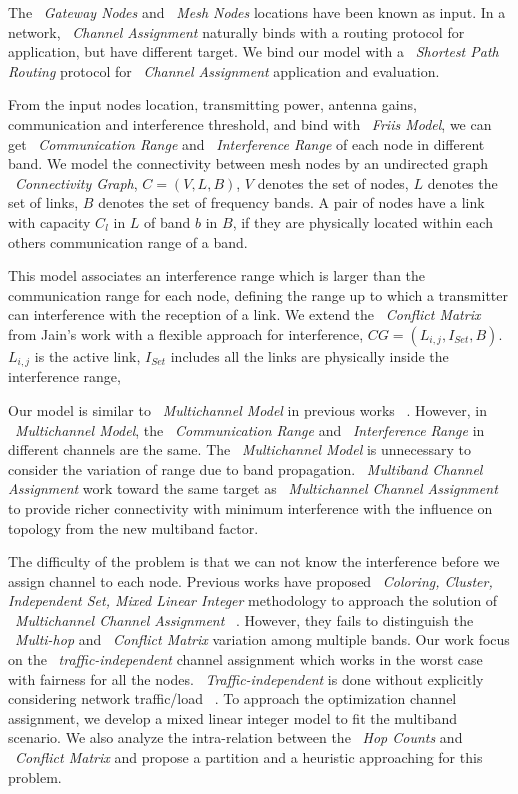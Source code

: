 The ~\emph{Gateway Nodes} and ~\emph{Mesh Nodes} locations have been known as input. In a network, ~\emph{Channel Assignment} naturally binds with a routing protocol for application, but have different target. We bind our model with a ~\emph{Shortest Path Routing} protocol for ~\emph{Channel Assignment} application and evaluation.

From the input nodes location, transmitting power, antenna gains, communication and interference threshold, and bind with ~\emph{Friis Model}, we can get ~\emph{Communication Range} and ~\emph{Interference Range} of each node in different band. 
We model the connectivity between mesh nodes by an undirected graph ~\emph{Connectivity Graph}, $C=(V,L,B)$, $V$ denotes the set of nodes, $L$ denotes the set of links, $B$ denotes the set of frequency bands. A pair of nodes have a link with capacity $C_l$ in $L$ of band $b$ in $B$, if they are physically located within each others communication range of a band. 

This model associates an interference range which is larger than the communication range for each node, defining the range up to which a transmitter can interference with the reception of a link. We extend the ~\emph{Conflict Matrix} from Jain's work with a flexible approach for interference, $CG=(L_{i,j},I_{Set},B)$. $L_{i,j}$ is the active link, $I_{Set}$ includes all the links are physically inside the interference range, 

Our model is similar to ~\emph{Multichannel Model} in previous works ~\cite{tang2005interference,yuan2006cross,si2010overview}. However, in ~\emph{Multichannel Model}, the ~\emph{Communication Range} and ~\emph{Interference Range} in different channels are the same. The ~\emph{Multichannel Model} is unnecessary to consider the variation of range due to band propagation.
~\emph{Multiband Channel Assignment} work toward the same target as ~\emph{Multichannel Channel Assignment} to provide richer connectivity with minimum interference with the influence on topology from the new multiband factor.

The difficulty of the problem is that we can not know the interference before we assign channel to each node. Previous works have proposed ~\emph{Coloring, Cluster, Independent Set, Mixed Linear Integer} methodology to approach the solution of ~\emph{Multichannel Channel Assignment} ~\cite{mishra2005weighted,peng2012efficient,tang2005interference}. 
However, they fails to distinguish the ~\emph{Multi-hop} and ~\emph{Conflict Matrix} variation among multiple bands.
Our work focus on the ~\emph{traffic-independent} channel assignment which works in the worst case with fairness for all the nodes.
~\emph{Traffic-independent} is done without explicitly considering network traffic/load ~\cite{marina2010topology}.
To approach the optimization channel assignment, we develop a mixed linear integer model to fit the multiband scenario. We also analyze the intra-relation between the ~\emph{Hop Counts} and ~\emph{Conflict Matrix} and propose a partition and a heuristic approaching for this problem.

